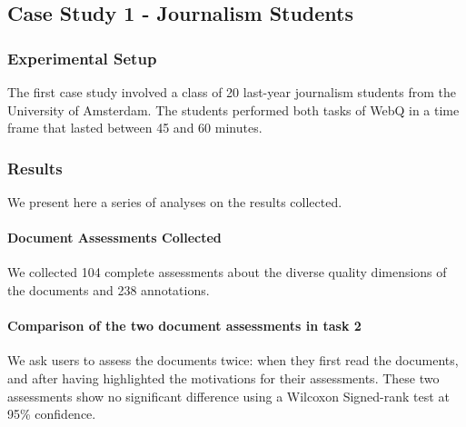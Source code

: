 \documentclass{llncs}
\begin{document}
\subsection{Case Study 1 - Journalism Students}
\subsubsection{Experimental Setup} The first case study involved a class of 20 last-year journalism students from the University of Amsterdam. The students performed both tasks of WebQ in a time frame that lasted between 45 and 60 minutes.
\subsubsection{Results} We present here a series of analyses on the results collected. 
\paragraph{Document Assessments Collected} We collected 104 complete assessments about the diverse quality dimensions of the documents and 238 annotations.
\paragraph{Comparison of the two document assessments in task 2}
We ask users to assess the documents twice: when they first read the documents, and after having highlighted the motivations for their assessments. These two assessments show no significant difference using a Wilcoxon Signed-rank test at 95\% confidence.%
\end{document}

